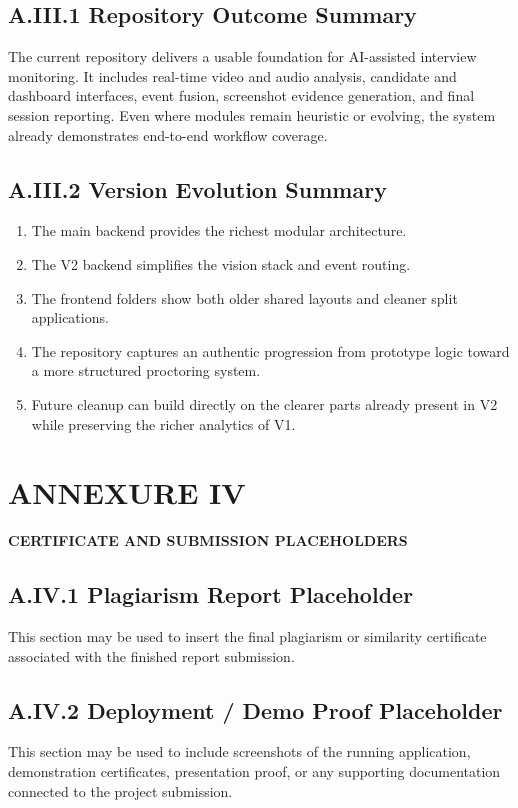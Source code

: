\documentclass[12pt,a4paper]{extreport}
\begin{document}
\section*{A.III.1 Repository Outcome Summary}
The current repository delivers a usable foundation for AI-assisted interview monitoring. It includes real-time video and audio analysis, candidate and dashboard interfaces, event fusion, screenshot evidence generation, and final session reporting. Even where modules remain heuristic or evolving, the system already demonstrates end-to-end workflow coverage.

\section*{A.III.2 Version Evolution Summary}
\begin{enumerate}
  \item The main backend provides the richest modular architecture.
  \item The V2 backend simplifies the vision stack and event routing.
  \item The frontend folders show both older shared layouts and cleaner split applications.
  \item The repository captures an authentic progression from prototype logic toward a more structured proctoring system.
  \item Future cleanup can build directly on the clearer parts already present in V2 while preserving the richer analytics of V1.
\end{enumerate}

\chapter*{ANNEXURE IV}
\begin{center}
\bfseries CERTIFICATE AND SUBMISSION PLACEHOLDERS
\end{center}

\section*{A.IV.1 Plagiarism Report Placeholder}
This section may be used to insert the final plagiarism or similarity certificate associated with the finished report submission.

\section*{A.IV.2 Deployment / Demo Proof Placeholder}
This section may be used to include screenshots of the running application, demonstration certificates, presentation proof, or any supporting documentation connected to the project submission.
\end{document}
